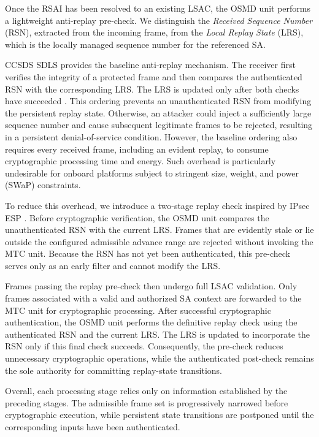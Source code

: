 \documentclass[journal]{IEEEtran}
\begin{document}
Once the RSAI has been resolved to an existing LSAC, the OSMD unit performs a lightweight anti-replay pre-check. 
We distinguish the \textit{Received Sequence Number} (RSN), extracted from the incoming frame, from the \textit{Local Replay State} (LRS), which is the locally managed sequence number \cite{ccsds2022sdls} for the referenced SA.

CCSDS SDLS provides the baseline anti-replay mechanism.
The receiver first verifies the integrity of a protected frame and then compares the authenticated RSN with the corresponding LRS.
The LRS is updated only after both checks have succeeded \cite{ccsds2022sdls}. 
This ordering prevents an unauthenticated RSN from modifying the persistent replay state.
Otherwise, an attacker could inject a sufficiently large sequence number and cause subsequent legitimate frames to be rejected, resulting in a persistent denial-of-service condition.
However, the baseline ordering also requires every received frame, including an evident replay, to consume cryptographic processing time and energy.
Such overhead is particularly undesirable for onboard platforms subject to stringent size, weight, and power (SWaP) constraints.

To reduce this overhead, we introduce a two-stage replay check inspired by IPsec ESP \cite{kent2005security4303}.
Before cryptographic verification, the OSMD unit compares the unauthenticated RSN with the current LRS.
Frames that are evidently stale or lie outside the configured admissible advance range are rejected without invoking the MTC unit.
Because the RSN has not yet been authenticated, this pre-check serves only as an early filter and cannot modify the LRS.

Frames passing the replay pre-check then undergo full LSAC validation.
Only frames associated with a valid and authorized SA context are forwarded to the MTC unit for cryptographic processing.
After successful cryptographic authentication, the OSMD unit performs the definitive replay check using the authenticated RSN and the current LRS.
The LRS is updated to incorporate the RSN only if this final check succeeds.
Consequently, the pre-check reduces unnecessary cryptographic operations, while the authenticated post-check remains the sole authority for committing replay-state transitions.

Overall, each processing stage relies only on information established by the preceding stages.
The admissible frame set is progressively narrowed before cryptographic execution, while persistent state transitions are postponed until the corresponding inputs have been authenticated.
\end{document}
